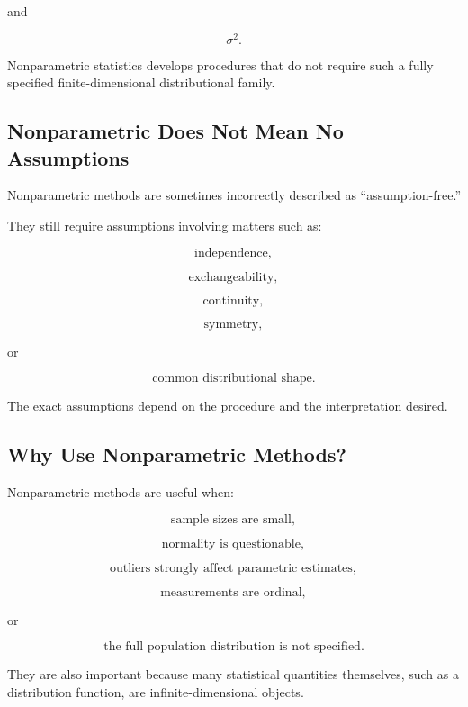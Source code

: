 and

\[
\sigma^2.
\]

Nonparametric statistics develops procedures that do not require such a
fully specified finite-dimensional distributional family.

\subsection{Nonparametric Does Not Mean No Assumptions}
\label{subsec:nonparametric-not-assumption-free}

Nonparametric methods are sometimes incorrectly described as
``assumption-free.''

They still require assumptions involving matters such as:

\[
\boxed{
\text{independence},
}
\]

\[
\boxed{
\text{exchangeability},
}
\]

\[
\boxed{
\text{continuity},
}
\]

\[
\boxed{
\text{symmetry},
}
\]

or

\[
\boxed{
\text{common distributional shape}.
}
\]

The exact assumptions depend on the procedure and the interpretation
desired.

\subsection{Why Use Nonparametric Methods?}
\label{subsec:why-use-nonparametric}

Nonparametric methods are useful when:

\[
\boxed{
\text{sample sizes are small},
}
\]

\[
\boxed{
\text{normality is questionable},
}
\]

\[
\boxed{
\text{outliers strongly affect parametric estimates},
}
\]

\[
\boxed{
\text{measurements are ordinal},
}
\]

or

\[
\boxed{
\text{the full population distribution is not specified}.
}
\]

They are also important because many statistical quantities themselves,
such as a distribution function, are infinite-dimensional objects.

